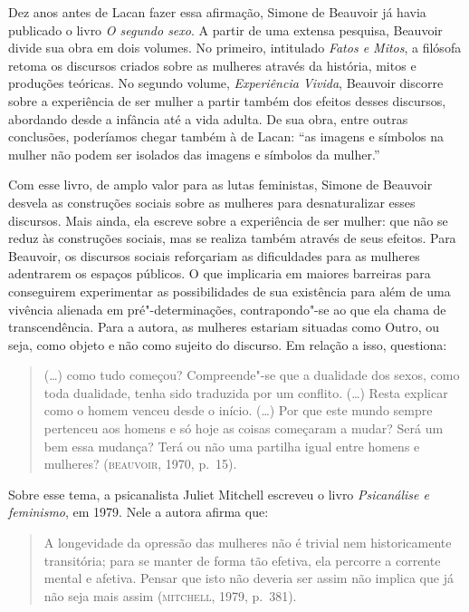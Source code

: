Dez anos antes de Lacan fazer essa afirmação, Simone de Beauvoir já
havia publicado o livro \emph{O segundo sexo}. A partir de uma extensa
pesquisa, Beauvoir divide sua obra em dois volumes. No primeiro,
intitulado \emph{Fatos e Mitos}, a filósofa retoma os discursos criados
sobre as mulheres através da história, mitos e produções teóricas. No
segundo volume, \emph{Experiência Vivida}, Beauvoir discorre sobre a
experiência de ser mulher a partir também dos efeitos desses discursos,
abordando desde a infância até a vida adulta. De sua obra, entre outras
conclusões, poderíamos chegar também à de Lacan: ``as imagens e símbolos
na mulher não podem ser isolados das imagens e símbolos da mulher.''

Com esse livro, de amplo valor para as lutas feministas, Simone de
Beauvoir desvela as construções sociais sobre as mulheres para
desnaturalizar esses discursos. Mais ainda, ela escreve sobre a
experiência de ser mulher: que não se reduz às construções sociais, mas
se realiza também através de seus efeitos. Para Beauvoir, os discursos
sociais reforçariam as dificuldades para as mulheres adentrarem os
espaços públicos. O que implicaria em maiores barreiras para conseguirem
experimentar as possibilidades de sua existência para além de uma
vivência alienada em pré"-determinações, contrapondo"-se ao que ela chama
de transcendência. Para a autora, as mulheres estariam situadas como
Outro, ou seja, como objeto e não como sujeito do discurso. Em relação a
isso, questiona:

\begin{quote}
(\ldots{}) como tudo começou? Compreende"-se que a dualidade dos sexos, como
toda dualidade, tenha sido traduzida por um conflito. (\ldots{}) Resta
explicar como o homem venceu desde o início. (\ldots{}) Por que este mundo
sempre pertenceu aos homens e só hoje as coisas começaram a mudar? Será
um bem essa mudança? Terá ou não uma partilha igual entre homens e
mulheres? (\textsc{beauvoir}, 1970, p.~15).
\end{quote}

Sobre esse tema, a psicanalista Juliet Mitchell escreveu o livro
\emph{Psicanálise e feminismo}, em 1979. Nele a autora afirma que:

\begin{quote}
A longevidade da opressão das mulheres não é trivial nem
historicamente transitória; para se manter de forma tão efetiva, ela
percorre a corrente mental e afetiva. Pensar que isto não deveria ser
assim não implica que já não seja mais assim (\textsc{mitchell}, 1979, p.~381).
\end{quote}

